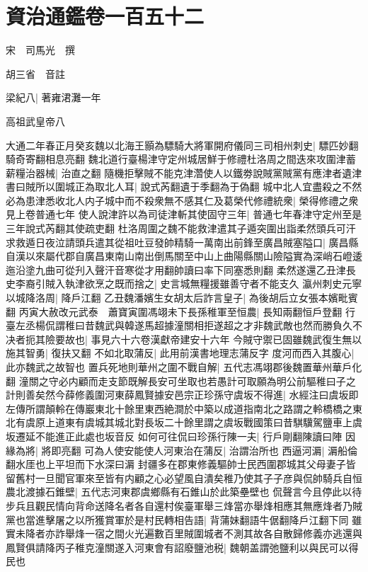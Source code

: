 \section{資治通鑑卷一百五十二}
宋　司馬光　撰

胡三省　音註

梁紀八|{
	著雍涒灘一年}


高祖武皇帝八

大通二年春正月癸亥魏以北海王顥為驃騎大將軍開府儀同三司相州刺史|{
	驃匹妙翻騎奇寄翻相息亮翻}
魏北道行臺楊津守定州城居鮮于修禮杜洛周之間迭來攻圍津蓄薪糧治器械|{
	治直之翻}
隨機拒擊賊不能克津濳使人以鐵劵說賊黨賊黨有應津者遺津書曰賊所以圍城正為取北人耳|{
	說式芮翻遺于季翻為于偽翻}
城中北人宜盡殺之不然必為患津悉收北人内子城中而不殺衆無不感其仁及葛榮代修禮統衆|{
	榮得修禮之衆見上卷普通七年}
使人說津許以為司徒津斬其使固守三年|{
	普通七年春津守定州至是三年說式芮翻其使疏吏翻}
杜洛周圍之魏不能救津遣其子遁突圍出詣柔然頭兵可汗求救遁日夜泣請頭兵遣其從祖吐豆發帥精騎一萬南出前鋒至廣昌賊塞隘口|{
	廣昌縣自漢以來屬代郡自廣昌東南山南出倒馬關至中山上曲陽縣關山險隘實為深峭石嶝逶迤沿塗九曲可從刋入聲汗音寒從才用翻帥讀曰率下同塞悉則翻}
柔然遂還乙丑津長史李裔引賊入執津欲烹之既而捨之|{
	史言城無糧援雖善守者不能支久}
瀛州刺史元寧以城降洛周|{
	降戶江翻}
乙丑魏潘嬪生女胡太后詐言皇子|{
	為後胡后立女張本嬪毗賓翻}
丙寅大赦改元武泰　蕭寶寅圍馮翊未下長孫稚軍至恒農|{
	長知兩翻恒戶登翻}
行臺左丞楊侃謂稚曰昔魏武與韓遂馬超據潼關相拒遂超之才非魏武敵也然而勝負久不决者扼其險要故也|{
	事見六十六卷漢獻帝建安十六年}
今賊守禦已固雖魏武復生無以施其智勇|{
	復扶又翻}
不如北取蒲反|{
	此用前漢書地理志蒲反字}
度河而西入其腹心|{
	此亦魏武之故智也}
置兵死地則華州之圍不戰自解|{
	五代志馮翊郡後魏置華州華戶化翻}
潼關之守必内顧而走支節既解長安可坐取也若愚計可取願為明公前驅稚曰子之計則善矣然今薛修義圍河東薛鳳賢據安邑宗正珍孫守虞坂不得進|{
	水經注曰虞坂即左傳所謂顛軨在傳巖東北十餘里東西絶澗於中築以成道指南北之路謂之軨橋橋之東北有虞原上道東有虞城其城北對長坂二十餘里謂之虞坂戰國策曰昔騏驥駕鹽車上虞坂遷延不能進正此處也坂音反}
如何可往侃曰珍孫行陳一夫|{
	行戶剛翻陳讀曰陣}
因緣為將|{
	將即亮翻}
可為人使安能使人河東治在蒲反|{
	治謂治所也}
西逼河漘|{
	漘船倫翻水厓也上平坦而下水深曰漘}
封疆多在郡東修義驅帥士民西圍郡城其父母妻子皆留舊村一旦聞官軍來至皆有内顧之心必望風自潰矣稚乃使其子子彦與侃帥騎兵自恒農北渡據石錐壁|{
	五代志河東郡虞鄉縣有石錐山於此築壘壁也}
侃聲言今且停此以待步兵且觀民情向背命送降名者各自還村俟臺軍舉三烽當亦舉烽相應其無應烽者乃賊黨也當進擊屠之以所獲賞軍於是村民轉相告語|{
	背蒲妹翻語牛倨翻降戶江翻下同}
雖實未降者亦詐舉烽一宿之間火光遍數百里賊圍城者不測其故各自散歸修義亦逃還與鳳賢俱請降丙子稚克潼關遂入河東會有詔廢鹽池税|{
	魏朝盖謂弛鹽利以與民可以得民也}
